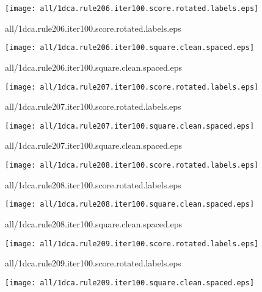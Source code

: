 \documentclass{article}
\begin{document}
\begin{center}
\begin{minipage}{\textwidth}
\texttt{[image: all/1dca.rule206.iter100.score.rotated.labels.eps]}
\end{minipage}
\end{center}
{\footnotesize all/1dca.rule206.iter100.score.rotated.labels.eps}
\begin{center}
\begin{minipage}{\textwidth}
\texttt{[image: all/1dca.rule206.iter100.square.clean.spaced.eps]}
\end{minipage}
\end{center}
{\footnotesize all/1dca.rule206.iter100.square.clean.spaced.eps}
\begin{center}
\begin{minipage}{\textwidth}
\texttt{[image: all/1dca.rule207.iter100.score.rotated.labels.eps]}
\end{minipage}
\end{center}
{\footnotesize all/1dca.rule207.iter100.score.rotated.labels.eps}
\begin{center}
\begin{minipage}{\textwidth}
\texttt{[image: all/1dca.rule207.iter100.square.clean.spaced.eps]}
\end{minipage}
\end{center}
{\footnotesize all/1dca.rule207.iter100.square.clean.spaced.eps}
\begin{center}
\begin{minipage}{\textwidth}
\texttt{[image: all/1dca.rule208.iter100.score.rotated.labels.eps]}
\end{minipage}
\end{center}
{\footnotesize all/1dca.rule208.iter100.score.rotated.labels.eps}
\begin{center}
\begin{minipage}{\textwidth}
\texttt{[image: all/1dca.rule208.iter100.square.clean.spaced.eps]}
\end{minipage}
\end{center}
{\footnotesize all/1dca.rule208.iter100.square.clean.spaced.eps}
\begin{center}
\begin{minipage}{\textwidth}
\texttt{[image: all/1dca.rule209.iter100.score.rotated.labels.eps]}
\end{minipage}
\end{center}
{\footnotesize all/1dca.rule209.iter100.score.rotated.labels.eps}
\begin{center}
\begin{minipage}{\textwidth}
\texttt{[image: all/1dca.rule209.iter100.square.clean.spaced.eps]}
\end{minipage}
\end{center}
\end{document}
